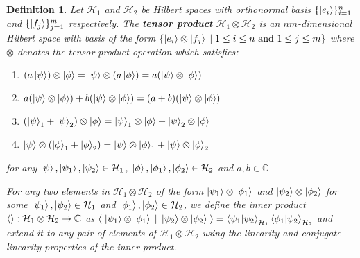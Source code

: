 \documentclass[12pt,twoside,fleqn]{report}
\theoremstyle{thmstyle}
\newtheorem{defn}{Definition}[chapter]
\begin{document}
\begin{defn}
    Let $\mathcal{H}_1$ and $\mathcal{H}_2$ be Hilbert spaces with orthonormal basis $\{ \ket{e_i} \}_{i=1}^n$ and $\{ \ket{f_j} \}_{j=1}^m$ respectively.
    The \textbf{tensor product} $\mathcal{H}_1 \otimes \mathcal{H}_2$  is an $nm$-dimensional Hilbert space with basis of the form $\{ \ket{e_i} \otimes \ket{f_j} \; | \; 1 \leq i \leq n \text{ and } 1 \leq j \leq m \}$ where $\otimes$ denotes the tensor product operation which satisfies:
    \begin{enumerate}
        \item $(a \ket\psi) \otimes \ket\phi = \ket\psi \otimes (a \ket\phi) = a (\ket\psi \otimes \ket\phi)$
        \item $a (\ket\psi \otimes \ket\phi) + b (\ket\psi \otimes \ket\phi) = (a + b) (\ket\psi \otimes \ket\phi)$
        \item $(\ket\psi_1 + \ket\psi_2) \otimes \ket\phi = \ket\psi_1 \otimes \ket\phi + \ket\psi_2 \otimes \ket\phi$
        \item $\ket\psi \otimes (\ket\phi_1 + \ket\phi_2) = \ket\psi \otimes \ket\phi_1 + \ket\psi \otimes \ket\phi_2$
    \end{enumerate}
    for any $\ket{\psi},\ket{\psi_1},\ket{\psi_2} \in \mathcal{H}_1$, $\ket{\phi}, \ket{\phi_1}, \ket{\phi_2} \in \mathcal{H}_2$ and $a, b \in \mathbb{C}$

    For any two elements in $\mathcal{H}_1 \otimes \mathcal{H}_2$ of the form $\ket{\psi_1} \otimes \ket{\phi_1}$ and $\ket{\psi_2} \otimes \ket{\phi_2}$ for some $\ket{\psi_1}, \ket{\psi_2} \in \mathcal{H}_1$ and $\ket{\phi_1}, \ket{\phi_2} \in \mathcal{H}_2$, we define the inner product $\braket{} : \mathcal{H}_1 \otimes \mathcal{H}_2 \to \mathbb{C}$ as $\braket{\; \ket{\psi_1} \otimes \ket{\phi_1} \; | \; \ket{\psi_2} \otimes \ket{\phi_2} \;} = \braket{\psi_1|\psi_2}_{\mathcal{H}_1}\braket{\phi_1|\psi_2}_{\mathcal{H}_2}$ and extend it to any pair of elements of $\mathcal{H}_1 \otimes \mathcal{H}_2$ using the linearity and conjugate linearity properties of the inner product.
\end{defn}
\end{document}
